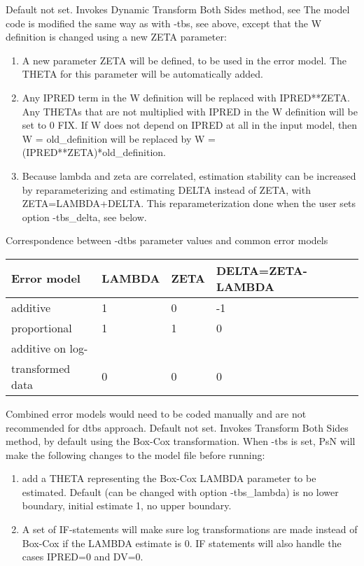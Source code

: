 \begin{optionlist}
Default not set. Invokes Dynamic Transform Both Sides method, see \cite{Dosne2012} The model code is modified the same way as with -tbs, see above, except that the W definition is changed using a new ZETA parameter:
\begin{enumerate}
	\item A new parameter ZETA will be defined, to be used in the error model. The THETA for this parameter will be automatically added.
	\item Any IPRED term in the W definition will be replaced with IPRED**ZETA. Any THETAs that are not multiplied with IPRED in the W definition will be set to 0 FIX. If W does not depend on IPRED at all in the input model, then W = old\_definition will be replaced by W = (IPRED**ZETA)*old\_definition.
	\item Because lambda and zeta are correlated, estimation stability can be increased by reparameterizing and estimating DELTA instead of ZETA, with ZETA=LAMBDA+DELTA. This reparameterization done when the user sets option -tbs\_delta, see below.
\end{enumerate}
Correspondence between -dtbs parameter values and common error models\\
\begin{tabular}{|l|l|l|l|}
	\hline
	Error model & LAMBDA & ZETA & DELTA=ZETA-LAMBDA\\
	\hline
	additive & 1 & 0 & -1 \\
	\hline
	proportional & 1 & 1 & 0 \\
	\hline
	additive on log-&  &  &  \\
	transformed data & 0 & 0 & 0 \\
	\hline
\end{tabular}
Combined error models would need to be coded manually and are not recommended for dtbs approach.
\nextopt
{}
Default not set. Invokes Transform Both Sides method, by default using the Box-Cox transformation. When -tbs is set, PsN will make the following changes to the model file before running:
\begin{enumerate}
	\item add a THETA representing the Box-Cox LAMBDA parameter to be estimated. Default (can be changed with option -tbs\_lambda) is no lower boundary, initial estimate 1, no upper boundary.
	\item A set of IF-statements will make sure log transformations are made instead of Box-Cox if the LAMBDA estimate is 0. IF statements will also handle the cases IPRED=0 and DV=0.

\end{enumerate}
\end{optionlist}
